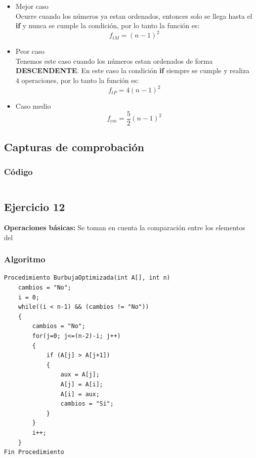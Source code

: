 \documentclass[12pt]{article}
\begin{document}
	    		\begin{itemize}
	    			\item[\Checklist] Mejor caso \\
	    			Ocurre cuando los números ya estan ordenados, entonces solo se llega hasta el \textbf{if} y nunca se cumple la condición, por lo tanto la función es:
	    			$$
	    				f_{tM} = (n-1)^{2}
	    			$$
	    			\item[\Checklist] Peor caso \\
					Tenemos este caso cuando los números estan ordenados de forma \textbf{DESCENDENTE}. En este caso la condición \textbf{if} siempre se cumple y realiza $4$ operaciones, por lo tanto la función es:
					$$
						f_{tP} = 4(n-1)^{2}
					$$
 
					\item[\Checklist] Caso medio \\
					$$
						f_{cm} = \frac{5}{2}(n-1)^{2}	
					$$
				\end{itemize}
	        \subsection{Capturas de comprobación}

	        \subsubsection{Código}
	            \begin{lstlisting}[style=Java]
    		    \end{lstlisting}


	
	    \subsection{Ejercicio 12}
		\textbf{Operaciones básicas:} Se toman en cuenta la comparación entre los elementos del
		
			\subsubsection{Algoritmo}
			    \begin{lstlisting}[style=Java]
Procedimiento BurbujaOptimizada(int A[], int n)	
	cambios = "No";
	i = 0;
	while((i < n-1) && (cambios != "No"))
	{
		cambios = "No";
		for(j=0; j<=(n-2)-i; j++)
		{
			if (A[j] > A[j+1])
			{
				aux = A[j];
				A[j] = A[i];
				A[i] = aux;
				cambios = "Si";
			}
		}
		i++;
	}
Fin Procedimiento 
    		    \end{lstlisting}
\end{document}
